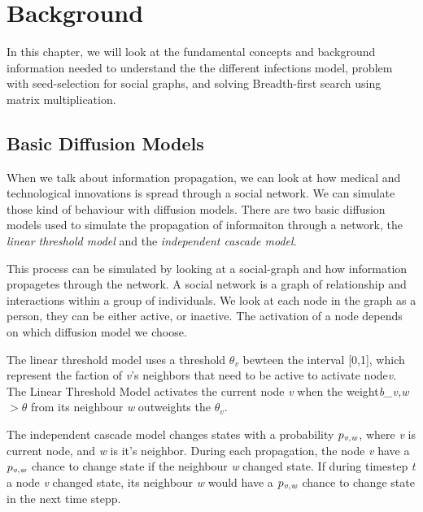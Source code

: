 \chapter{Background} 

In this chapter, we will look at the fundamental concepts and background information needed to understand the the different infections model, problem with seed-selection for social graphs, and solving Breadth-first search using matrix multiplication.

\section{Basic Diffusion Models}
When we talk about information propagation, we can look at how medical and technological innovations is spread through a social network. We can simulate those kind of behaviour with diffusion models. There are two basic diffusion models used to simulate the propagation of informaiton through a network\cite{kempe}, the {\it linear threshold model} and the {\it independent cascade model}\cite{kempe}.

This process can be simulated by looking at a social-graph and how information propagetes through the network. A social network is a graph of relationship and interactions within a group of individuals. 
We look at each node in the graph as a person, they can be either active, or inactive. The activation of a node depends on which diffusion model we choose.

The linear threshold model uses a threshold $\theta_v$ bewteen the interval [0,1], which represent the faction of {\it v}'s neighbors that need to be active to activate node{\it v}. The Linear Threshold Model activates the current node {\it v} when the weight{\it b_{v,w}} $> \theta$ from its neighbour {\it w} outweights the $\theta_v$. 

The independent cascade model changes states with a probability $p_{\it v, w}$, where {\it v }is current node, and {\it w} is it's neighbor. During each propagation, the node {\it v} have a  $p_{\it v, w}$ chance to change state if the neighbour {\it w} changed state. If during timestep {\it t} a node {\it v} changed state, its neighbour {\it w} would have a  $p_{\it v, w}$ chance to change state in the next time stepp.